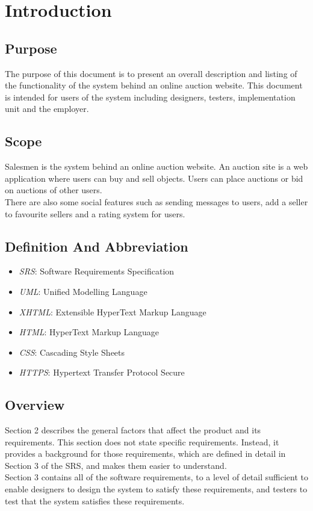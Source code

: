 \chapter{Introduction}
\section{Purpose}
	The purpose of this document is to present an overall description and 
	listing of the functionality of the system behind an online auction 
	website. This document is intended for users of the system including
	designers, testers, implementation unit and the employer.
\section{Scope}
	Salesmen is the system behind an online auction website. An auction site 
	is a web application where users can buy and sell objects. Users can 
	place auctions or bid on auctions of other users. \\
	There are also some social features such as sending messages to users,
	add a seller to favourite sellers and a rating system for users.
\section{Definition And Abbreviation}
	\begin{itemize}
		\item \emph{SRS}: Software Requirements Specification
		\item \emph{UML}: Unified Modelling Language
		\item \emph{XHTML}: Extensible HyperText Markup Language
		\item \emph{HTML}: HyperText Markup Language
		\item \emph{CSS}: Cascading Style Sheets
		\item \emph{HTTPS}: Hypertext Transfer Protocol Secure
	\end{itemize}
\section{Overview}
	Section 2 describes the general factors that affect the product and 
	its requirements.                                                                                   
	This section does not state specific requirements. Instead, it provides a 
	background for those requirements, which are defined in detail in Section 
	3 of the SRS, and makes them easier to understand.\\
	Section 3 contains all of the software requirements, to a level of detail 
	sufficient to enable designers to design the system to satisfy these 
	requirements, and testers to test that the system satisfies these
	requirements.